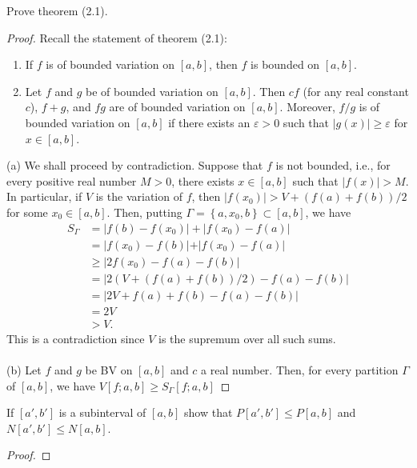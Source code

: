 \begin{problem}
Prove theorem (2.1).
\end{problem}
\begin{proof}
Recall the statement of theorem (2.1):
\begin{theorem*}
\begin{enumerate}[label=(\alph*)]
\item If $f$ is of bounded variation on $[a,b]$, then $f$ is bounded on
  $[a,b]$.
\item Let $f$ and $g$ be of bounded variation on $[a,b]$. Then $cf$ (for
  any real constant $c$), $f+g$, and $fg$ are of bounded variation on
  $[a,b]$. Moreover, $f/g$ is of bounded variation on $[a,b]$ if there
  exists an $\varepsilon>0$ such that $|g(x)|\geq\varepsilon$ for
  $x\in[a,b]$.
\end{enumerate}
\end{theorem*}
\bigskip

(a) We shall proceed by contradiction. Suppose that $f$ is not bounded,
i.e., for every positive real number $M>0$, there exists $x\in[a,b]$ such
that $|f(x)|>M$. In particular, if $V$ is the variation of $f$, then
$|f(x_0)|>V+(f(a)+f(b))/2$ for some $x_0\in[a,b]$. Then, putting
$\Gamma=\left\{a,x_0,b\right\}\subset[a,b]$, we have
\begin{align*}
S_\Gamma&=\left|f(b)-f(x_0)\right|+\left|f(x_0)-f(a)\right|\\
&=\left|f(x_0)-f(b)|+|f(x_0)-f(a)\right|\\
&\geq\left|2f(x_0)-f(a)-f(b)\right|\\
&=\left|2\left(V+(f(a)+f(b))/2\right)-f(a)-f(b)\right|\\
&=\left|2V+f(a)+f(b)-f(a)-f(b)\right|\\
&=2V\\
&>V.
\end{align*}
This is a contradiction since $V$ is the supremum over all such sums.
\\\\
(b) Let $f$ and $g$ be BV on $[a,b]$ and $c$ a real number. Then, for every
partition $\Gamma$ of $[a,b]$, we have $V[f;a,b]\geq S_\Gamma[f;a,b]$
\end{proof}
\newpage

\begin{problem}
If $[a',b']$ is a subinterval of $[a,b]$ show that $P[a',b']\leq P[a,b]$
and $N[a',b']\leq N[a,b]$.
\end{problem}
\begin{proof}
\end{proof}
\newpage

